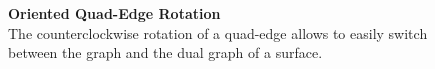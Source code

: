 \documentclass{stdlocal}
\begin{document}
\begin{figure}[H]
\begin{subfigure}[b]{0.67\linewidth}
  \end{subfigure}
  \caption[Oriented Quad-Edge Rotation]{
    \textbf{Oriented Quad-Edge Rotation}\\
    The counterclockwise rotation of a quad-edge allows to easily switch between the graph and the dual graph of a surface.
  }
  \label{fig:quad-edge-rotation}
\end{figure}

\newpage
{}

\end{document}
